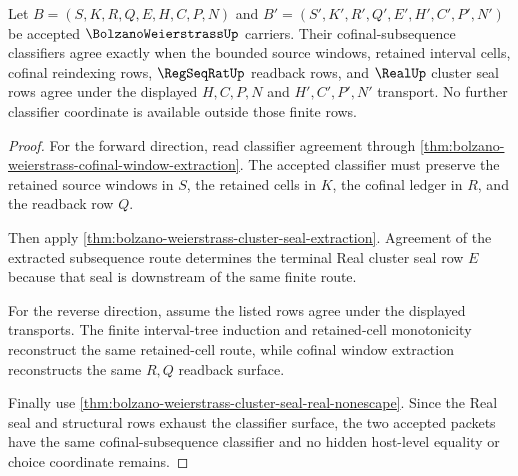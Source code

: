 \begin{theorem}
\label{thm:bolzano-weierstrass-cofinal-subsequence-classifier-exactness}
Let $B=(S,K,R,Q,E,H,C,P,N)$ and $B'=(S',K',R',Q',E',H',C',P',N')$ be accepted $\BolzanoWeierstrassUp$ carriers. Their cofinal-subsequence classifiers agree exactly when the bounded source windows, retained interval cells, cofinal reindexing rows, $\RegSeqRatUp$ readback rows, and $\RealUp$ cluster seal rows agree under the displayed $H,C,P,N$ and $H',C',P',N'$ transport. No further classifier coordinate is available outside those finite rows.
\end{theorem}
\begin{proof}
For the forward direction, read classifier agreement through \autoref{thm:bolzano-weierstrass-cofinal-window-extraction}. The accepted classifier must preserve the retained source windows in $S$, the retained cells in $K$, the cofinal ledger in $R$, and the readback row $Q$.

Then apply \autoref{thm:bolzano-weierstrass-cluster-seal-extraction}. Agreement of the extracted subsequence route determines the terminal Real cluster seal row $E$ because that seal is downstream of the same finite route.

For the reverse direction, assume the listed rows agree under the displayed transports. The finite interval-tree induction and retained-cell monotonicity reconstruct the same retained-cell route, while cofinal window extraction reconstructs the same $R,Q$ readback surface.

Finally use \autoref{thm:bolzano-weierstrass-cluster-seal-real-nonescape}. Since the Real seal and structural rows exhaust the classifier surface, the two accepted packets have the same cofinal-subsequence classifier and no hidden host-level equality or choice coordinate remains.
\end{proof}

